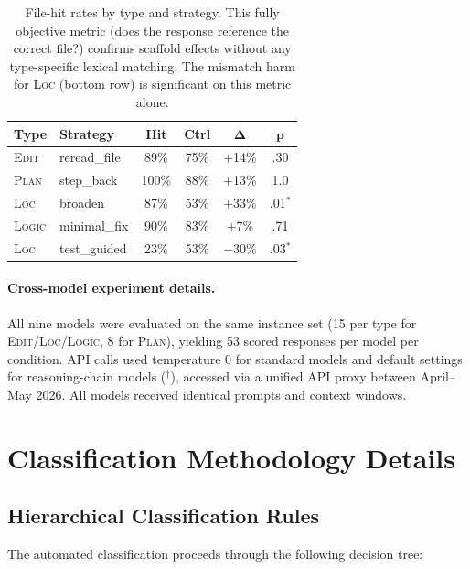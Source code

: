 \documentclass[11pt]{article}
\begin{document}
\begin{table}[t]
\centering
\small
\begin{tabular}{@{}llcccc@{}}
\toprule
\textbf{Type} & \textbf{Strategy} & \textbf{Hit} & \textbf{Ctrl} & $\boldsymbol{\Delta}$ & $\boldsymbol{p}$ \\
\midrule
\textsc{Edit} & reread\_file & 89\% & 75\% & +14\% & .30 \\
\textsc{Plan} & step\_back & 100\% & 88\% & +13\% & 1.0 \\
\textsc{Loc} & broaden & 87\% & 53\% & +33\% & .01$^*$ \\
\textsc{Logic} & minimal\_fix & 90\% & 83\% & +7\% & .71 \\
\midrule
\textsc{Loc} & test\_guided & 23\% & 53\% & $-$30\% & .03$^*$ \\
\bottomrule
\end{tabular}
\caption{File-hit rates by type and strategy. This fully objective metric (does the response reference the correct file?) confirms scaffold effects without any type-specific lexical matching. The mismatch harm for \textsc{Loc} (bottom row) is significant on this metric alone.}
\label{tab:filehit-robustness}
\end{table}

\paragraph{Cross-model experiment details.}
All nine models were evaluated on the same instance set (15 per type for \textsc{Edit}/\textsc{Loc}/\textsc{Logic}, 8 for \textsc{Plan}), yielding 53 scored responses per model per condition.
API calls used temperature 0 for standard models and default settings for reasoning-chain models ($^\dagger$), accessed via a unified API proxy between April--May 2026.
All models received identical prompts and context windows.


\section{Classification Methodology Details}
\label{app:classification}

\subsection{Hierarchical Classification Rules}

The automated classification proceeds through the following decision tree:
\end{document}
